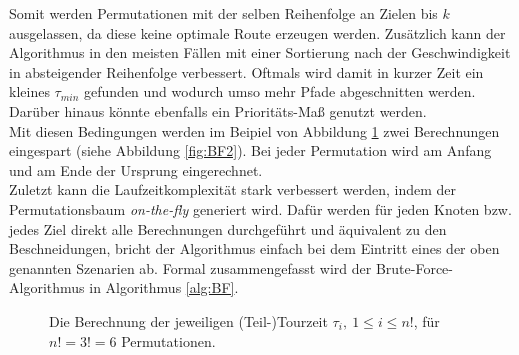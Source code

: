 \documentclass[german,version-2019-11]{uzl-thesis}
\begin{document}
Somit werden Permutationen mit der selben Reihenfolge an Zielen bis $k$ ausgelassen, da diese keine optimale Route erzeugen werden. Zusätzlich kann der Algorithmus in den meisten Fällen mit einer Sortierung nach der Geschwindigkeit in absteigender Reihenfolge verbessert. Oftmals wird damit in kurzer Zeit ein kleines $\tau_{min}$ gefunden und wodurch umso mehr Pfade abgeschnitten werden. Darüber hinaus könnte ebenfalls ein Prioritäts-Maß genutzt werden. \\
Mit diesen Bedingungen werden im Beipiel von Abbildung \ref{fig:BF1} zwei Berechnungen eingespart (siehe Abbildung \ref{fig:BF2}). Bei jeder Permutation wird am Anfang und am Ende der Ursprung eingerechnet. \\
Zuletzt kann die Laufzeitkomplexität stark verbessert werden, indem der Permutationsbaum \emph{on-the-fly} generiert wird. Dafür werden für jeden Knoten bzw. jedes Ziel direkt alle Berechnungen durchgeführt und äquivalent zu den Beschneidungen, bricht der Algorithmus einfach bei dem Eintritt eines der oben genannten Szenarien ab. Formal zusammengefasst wird der Brute-Force-Algorithmus in Algorithmus \ref{alg:BF}. \\

\begin{figure}[htbp]
\centering
{}
\caption{Die Berechnung der jeweiligen (Teil-)Tourzeit $\tau_{i}, ~1\leq i\leq n!$, für $n!=3!=6$ Permutationen.}
\label{fig:BF1}
\end{figure}
\end{document}
